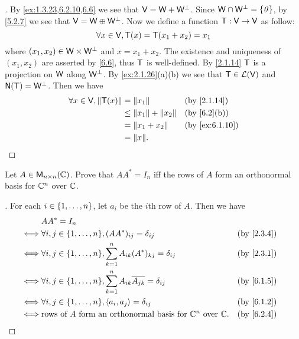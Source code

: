 \begin{proof}[]
	By \cref{ex:1.3.23,6.2.10,6.6} we see that \(\mathsf{V} = \mathsf{W} + \mathsf{W}^{\perp}\).
	Since \(\mathsf{W} \cap \mathsf{W}^{\perp} = \left\lbrace\mathit{0}\right\rbrace\), by \cref{5.2.7} we see that \(\mathsf{V} = \mathsf{W} \oplus \mathsf{W}^{\perp}\).
	Now we define a function \(\mathsf{T} : \mathsf{V} \to \mathsf{V}\) as follow:
	\[
		\forall x \in \mathsf{V}, \mathsf{T}(x) = \mathsf{T}(x_1 + x_2) = x_1
	\]
	where \((x_1, x_2) \in \mathsf{W} \times \mathsf{W}^{\perp}\) and \(x = x_1 + x_2\).
	The existence and uniqueness of \((x_1, x_2)\) are asserted by \cref{6.6}, thus \(\mathsf{T}\) is well-defined.
	By \cref{2.1.14} \(\mathsf{T}\) is a projection on \(\mathsf{W}\) along \(\mathsf{W}^{\perp}\).
	By \cref{ex:2.1.26}(a)(b) we see that \(\mathsf{T} \in \mathcal{L}(\mathsf{V})\) and \(\ns{\T} = \W^{\perp}\).
	Then we have
	\begin{align*}
		\forall x \in \V, \norm{\T(x)} & = \norm{x_1}                 &  & \by{2.1.14}    \\
		                               & \leq \norm{x_1} + \norm{x_2} &  & \by{6.2}[b]    \\
		                               & = \norm{x_1 + x_2}           &  & \by{ex:6.1.10} \\
		                               & = \norm{x}.
	\end{align*}
\end{proof}

\begin{ex}\label{ex:6.2.11}
	Let \(A \in \mathsf{M}_{{n} \times n}({\mathbb{C}})\).
	Prove that \(AA^* = I_n\) iff the rows of \(A\) form an orthonormal basis for \(\mathbb{C}^n\) over \(\mathbb{C}\).
\end{ex}

\begin{proof}[]
	For each \(i \in \left\lbrace1, \dots, n\right\rbrace\), let \(a_i\) be the \(i\)th row of \(A\).
	Then we have
	\begin{align*}
		     & AA^* = I_n                                                                                               \\
		\iff & \forall i, j \in \set{1, \dots, n}, (AA^*)_{i j} = \delta_{i j}                          &  & \by{2.3.4} \\
		\iff & \forall i, j \in \set{1, \dots, n}, \sum_{k = 1}^n A_{i k} (A^*)_{k j} = \delta_{i j}    &  & \by{2.3.1} \\
		\iff & \forall i, j \in \set{1, \dots, n}, \sum_{k = 1}^n A_{i k} \conj{A_{j k}} = \delta_{i j} &  & \by{6.1.5} \\
		\iff & \forall i, j \in \set{1, \dots, n}, \inn{a_i, a_j} = \delta_{i j}                        &  & \by{6.1.2} \\
		\iff & \text{rows of } A \text{ form an orthonormal basis for } \C^n \text{ over } \C.          &  & \by{6.2.4}
	\end{align*}
\end{proof}

